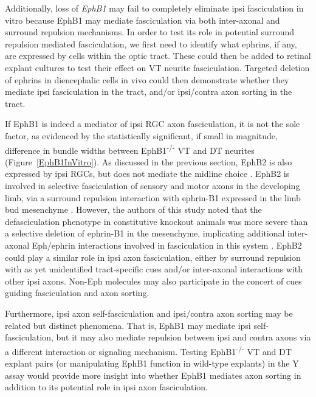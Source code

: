 Additionally, loss of \emph{EphB1} may fail to completely eliminate ipsi fasciculation in vitro because EphB1 may mediate fasciculation via both inter-axonal and surround repulsion mechanisms.
In order to test its role in potential surround repulsion mediated fasciculation, we first need to identify what ephrins, if any, are expressed by cells within the optic tract.
These could then be added to retinal explant cultures to test their effect on VT neurite fasciculation.
Targeted deletion of ephrins in diencephalic cells in vivo could then demonstrate whether they mediate ipsi fasciculation in the tract, and/or ipsi/contra axon sorting in the tract.

If EphB1 is indeed a mediator of ipsi RGC axon fasciculation, it is not the sole factor, as evidenced by the statistically significant, if small in magnitude, difference in bundle widths between EphB1\textsuperscript{-/-} VT and DT neurites (Figure~\ref{EphB1InVitro}).
As discussed in the previous section, EphB2 is also expressed by ipsi RGCs, but does not mediate the midline choice \cite{chenaux2011forward,williams2003ephrin}.
EphB2 is involved in selective fasciculation of sensory and motor axons in the developing limb, via a surround repulsion interaction with ephrin-B1 expressed in the limb bud mesenchyme \cite{luxey2013eph}.
However, the authors of this study noted that the defasciculation phenotype in constitutive knockout animals was more severe than a selective deletion of ephrin-B1 in the mesenchyme, implicating additional inter-axonal Eph/ephrin interactions involved in fasciculation in this system \cite{luxey2013eph}.
EphB2 could play a similar role in ipsi axon fasciculation, either by surround repulsion with as yet unidentified tract-specific cues and/or inter-axonal interactions with other ipsi axons.
Non-Eph molecules may also participate in the concert of cues guiding fasciculation and axon sorting.

Furthermore, ipsi axon self-fasciculation and ipsi/contra axon sorting may be related but distinct phenomena.
That is, EphB1 may mediate ipsi self-fasciculation, but it may also mediate repulsion between ipsi and contra axons via a different interaction or signaling mechanism.
Testing EphB1\textsuperscript{-/-} VT and DT explant pairs (or manipulating EphB1 function in wild-type explants) in the Y assay would provide more insight into whether EphB1 mediates axon sorting in addition to its potential role in ipsi axon fasciculation.